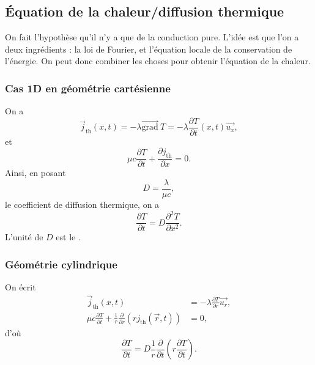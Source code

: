     \subsection{Équation de la chaleur/diffusion thermique}
            
        On fait l'hypothèse qu'il n'y a que de la conduction pure. L'idée est que l'on a deux ingrédients : la loi de Fourier, et l'équation locale de la conservation de l'énergie. On peut donc combiner les choses pour obtenir l'équation de la chaleur.

        \subsubsection{Cas 1D en géométrie cartésienne}
            
            On a 
            \begin{equation*}
                \vec{j}_{\text{th}}(x,t)=-\lambda\vec{\mathrm{grad}}~T=-\lambda\frac{\partial T}{\partial t}(x,t)\vec{u_x},
            \end{equation*}
            et
            \begin{equation*}
                \mu c\frac{\partial T}{\partial t}+\frac{\partial j_{\text{th}}}{\partial x}=0.
            \end{equation*}
            Ainsi, en posant
            \begin{equation*}
                \boxed{
                    D=\frac{\lambda}{\mu c},
                }
            \end{equation*}
            le coefficient de diffusion thermique, on a 
            \begin{equation*}
                \boxed{
                    \frac{\partial T}{\partial t}=D\frac{\partial^{2}T}{\partial x^{2}}.
                }
            \end{equation*}
            L'unité de $D$ est le \si[]{\metre\square\per\second}.

        \subsubsection{Géométrie cylindrique}
            
            On écrit 
            \begin{equation*}
                \begin{aligned}
                    \vec{j}_{\text{th}}(x,t)&=-\lambda\frac{\partial T}{\partial r}\vec{u_r},\\
                    \mu c\frac{\partial T}{\partial t}+\frac{1}{r}\frac{\partial}{\partial r}\left(rj_{\text{th}}(\vec{r},t)\right)&=0,
                \end{aligned}
            \end{equation*}
            d'où
            \begin{equation*}
                \boxed{
                    \frac{\partial T}{\partial t}=D\frac{1}{r}\frac{\partial}{\partial t}\left(r\frac{\partial T}{\partial t}\right).
                }
            \end{equation*}

